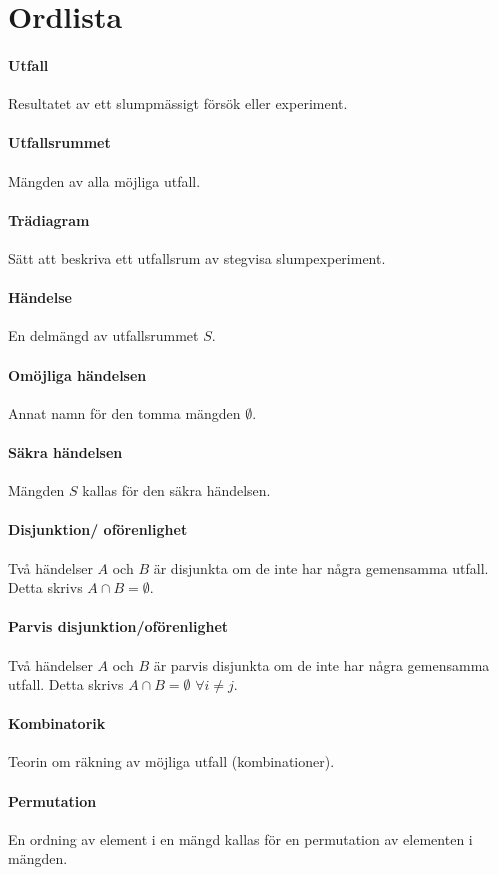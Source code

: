 \chapter{Ordlista}
\subsubsection{Utfall}
Resultatet av ett slumpmässigt försök eller experiment.

\subsubsection{Utfallsrummet}
Mängden av alla möjliga utfall.

\subsubsection{Trädiagram}
Sätt att beskriva ett utfallsrum av stegvisa slumpexperiment.

\subsubsection{Händelse}
En delmängd av utfallsrummet $S$.

\subsubsection{Omöjliga händelsen}
Annat namn för den tomma mängden $\emptyset$.

\subsubsection{Säkra händelsen}
Mängden $S$ kallas för den säkra händelsen.

\subsubsection{Disjunktion/ oförenlighet}
Två händelser $A$ och $B$ är disjunkta om de inte har några gemensamma utfall. Detta skrivs $A \cap B = \emptyset$.

\subsubsection{Parvis disjunktion/oförenlighet}
Två händelser $A$ och $B$ är parvis disjunkta om de inte har några gemensamma utfall. Detta skrivs $A \cap B = \emptyset$ $\forall i\neq j$.

\subsubsection{Kombinatorik}
Teorin om räkning av möjliga utfall (kombinationer).

\subsubsection{Permutation}
En ordning av element i en mängd kallas för en permutation av elementen i mängden.